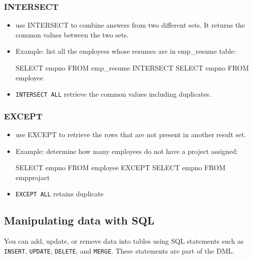 \documentclass{article}
\begin{document}
\subsubsection*{INTERSECT}
\begin{itemize}
\item use INTERSECT to combine answers from two different sets. It returns the common values between
the two sets.
\item Example: list all the employees whose resumes are in emp\_resume table:
\begin{sqlcode}
SELECT empno FROM emp_resume INTERSECT SELECT empno FROM employee
\end{sqlcode}
\item \texttt{INTERSECT ALL} retrieve the common values including duplicates.
\end{itemize}

\subsubsection*{EXCEPT}
\begin{itemize}
\item use EXCEPT to retrieve the rows that are not present in another result set.
\item Example: determine how many employees do not have a project assigned:
\begin{sqlcode}
SELECT empno FROM employee EXCEPT SELECT empno FROM empprojact
\end{sqlcode}
\item \texttt{EXCEPT ALL} retains duplicate
\end{itemize}

\subsection{Manipulating data with SQL}
You can add, update, or remove data into tables using SQL statements such as \texttt{INSERT}, \texttt{UPDATE}, \texttt{DELETE}, and \texttt{MERGE}. These statements are part of the DML.
\end{document}
